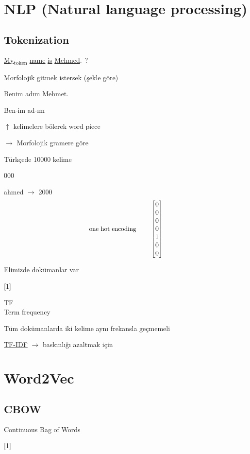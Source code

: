 \documentclass[11pt,a4paper]{article}
\begin{document}

\section{NLP (Natural language processing)}
\subsection{Tokenization}

\underline{My}\textsubscript{\scriptsize token} \underline{name} \underline{is} \underline{Mehmed}\textcircled{.}\textcolor{kirmizikalem}{\,?}

Morfolojik gitmek istersek (şekle göre)

Benim adım Mehmet.

\textcolor{turuncukalem}{Ben-im ad-ım}

$\uparrow$ kelimelere bölerek word piece

$\rightarrow$ Morfolojik gramere göre

Türkçede 10000 kelime

 000

\quad ahmed $\to$ 2000
\[ \text{\small one hot encoding}\qquad \begin{bmatrix}0\\0\\0\\0\\1\\0\\0\end{bmatrix} \]

Elimizde dokümanlar var

[1]

TF\\
{\small Term frequency}

Tüm dokümanlarda iki kelime aynı frekansla geçmemeli

\underline{TF-IDF} $\to$ baskınlığı azaltmak için

\section{Word2Vec}
\subsection{CBOW}
Continuous Bag of Words

[1]
\end{document}
